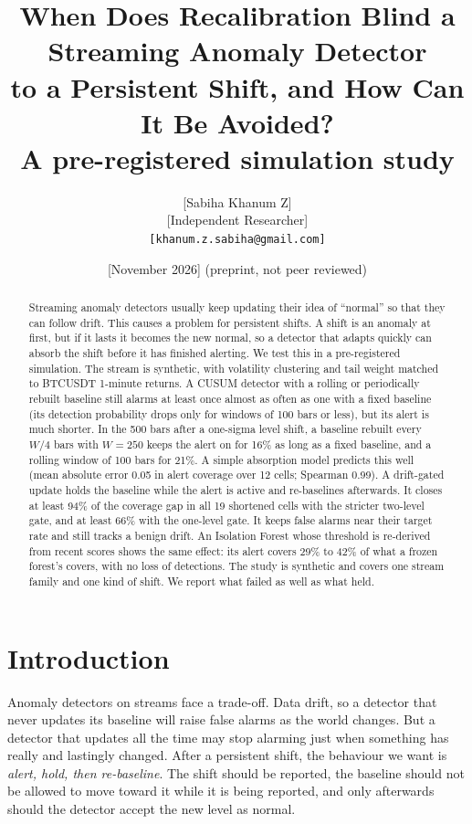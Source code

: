 \documentclass[11pt]{article}
\title{When Does Recalibration Blind a Streaming Anomaly Detector\\to a Persistent Shift, and How Can It Be Avoided?\\[0.3em]\large A pre-registered simulation study}
\author{{[Sabiha Khanum Z]}\\ {[Independent Researcher]}\\ \texttt{[khanum.z.sabiha@gmail.com]}}
\date{{[November 2026]} \quad (preprint, not peer reviewed)}
\begin{document}
\maketitle

\begin{abstract}
Streaming anomaly detectors usually keep updating their idea of ``normal'' so that they can follow drift. This causes a problem for persistent shifts. A shift is an anomaly at first, but if it lasts it becomes the new normal, so a detector that adapts quickly can absorb the shift before it has finished alerting. We test this in a pre-registered simulation. The stream is synthetic, with volatility clustering and tail weight matched to BTCUSDT 1-minute returns. A CUSUM detector with a rolling or periodically rebuilt baseline still alarms at least once almost as often as one with a fixed baseline (its detection probability drops only for windows of 100 bars or less), but its alert is much shorter. In the 500 bars after a one-sigma level shift, a baseline rebuilt every $W/4$ bars with $W=250$ keeps the alert on for 16\% as long as a fixed baseline, and a rolling window of 100 bars for 21\%. A simple absorption model predicts this well (mean absolute error 0.05 in alert coverage over 12 cells; Spearman 0.99). A drift-gated update holds the baseline while the alert is active and re-baselines afterwards. It closes at least 94\% of the coverage gap in all 19 shortened cells with the stricter two-level gate, and at least 66\% with the one-level gate. It keeps false alarms near their target rate and still tracks a benign drift. An Isolation Forest whose threshold is re-derived from recent scores shows the same effect: its alert covers 29\% to 42\% of what a frozen forest's covers, with no loss of detections. The study is synthetic and covers one stream family and one kind of shift. We report what failed as well as what held.
\end{abstract}

\section{Introduction}

Anomaly detectors on streams face a trade-off. Data drift, so a detector that never updates its baseline will raise false alarms as the world changes. But a detector that updates all the time may stop alarming just when something has really and lastingly changed. After a persistent shift, the behaviour we want is \emph{alert, hold, then re-baseline}. The shift should be reported, the baseline should not be allowed to move toward it while it is being reported, and only afterwards should the detector accept the new level as normal.
\end{document}
